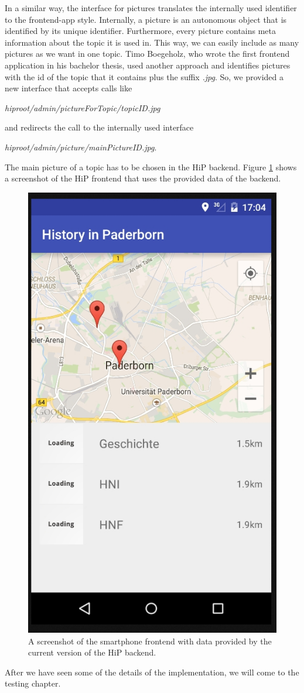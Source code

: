 In a similar way, the interface for pictures translates the internally used identifier to the frontend-app style. Internally, a picture is an autonomous object that is identified by its unique identifier. Furthermore, every picture contains meta information about the topic it is used in. This way, we can easily include as many pictures as we want in one topic. Timo Boegeholz, who wrote the first frontend application in his bachelor thesis, used another approach and identifies pictures with the id of the topic that it contains plus the suffix \emph{.jpg}. So, we provided a new interface that accepts calls like 

\emph{hiproot/admin/pictureForTopic/topicID.jpg} 

and redirects the call to the internally used interface

\emph{hiproot/admin/picture/mainPictureID.jpg}. 

The main picture of a topic has to be chosen in the \ac{HiP} backend. Figure \ref{frontendScreenshot} shows a screenshot of the \ac{HiP} frontend that uses the provided data of the backend.

\begin{figure}[th]
\centerline{\includegraphics[width=.5\textwidth]{gfx/frontend.jpg}}
\caption{A screenshot of the smartphone frontend with data provided by the current version of the \ac{HiP} backend.}
\label{frontendScreenshot}
\end{figure}     

After we have seen some of the details of the implementation, we will  come to the testing chapter. 